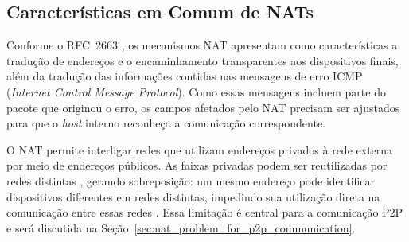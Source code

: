 \subsection{Características em Comum de NATs}

Conforme o RFC~2663 \citep{RFC2663}, os mecanismos NAT apresentam como características a tradução de endereços e o encaminhamento transparentes aos dispositivos finais, além da tradução das informações contidas nas mensagens de erro ICMP (\textit{Internet Control Message Protocol}). Como essas mensagens incluem parte do pacote que originou o erro, os campos afetados pelo NAT precisam ser ajustados para que o \textit{host} interno reconheça a comunicação correspondente.

O NAT permite interligar redes que utilizam endereços privados à rede externa por meio de endereços públicos. As faixas privadas podem ser reutilizadas por redes distintas \citep{rfc1597, rfc1918}, gerando sobreposição: um mesmo endereço pode identificar dispositivos diferentes em redes distintas, impedindo sua utilização direta na comunicação entre essas redes \citep{RFC1631}. Essa limitação é central para a comunicação P2P e será discutida na Seção~\ref{sec:nat_problem_for_p2p_communication}.

